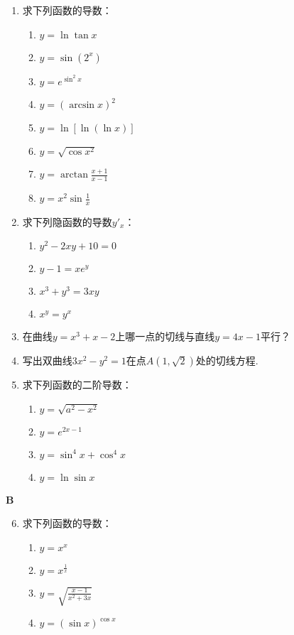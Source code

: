 \begin{enumerate}
    \item 求下列函数的导数： 
\begin{multicols}{2}
\begin{enumerate}[(1)]
    \item $y=\ln\tan x$
    \item $y=\sin(2^x)$
    \item $y=e^{\sin^2 x}$
    \item $y=(\arcsin x)^2$
    \item $y=\ln[\ln(\ln x)]$
    \item $y=\sqrt{\cos x^2}$
    \item $y=\arctan \frac{x+1}{x-1}$
    \item $y=x^2\sin\frac{1}{x}$
\end{enumerate}
\end{multicols}
    \item 求下列隐函数的导数$y'_x$：
\begin{multicols}{2}
\begin{enumerate}[(1)]
    \item $y^2-2xy+10=0$
    \item $y-1=xe^y$
    \item $x^3+y^3=3xy$
    \item $x^y=y^x$
\end{enumerate}
\end{multicols}
    \item 在曲线$y=x^3+x-2$上哪一点的切线与直线$y=4x-1$平行？
    \item  写出双曲线$3x^2-y^2=1$在点$A(1,\sqrt{2})$处的切线方程.
    \item  求下列函数的二阶导数：
\begin{multicols}{2}
\begin{enumerate}[(1)]
    \item $y=\sqrt{a^2-x^2}$
    \item $y=e^{2x-1}$
    \item $y=\sin^4 x+\cos^4 x$
    \item $y=\ln\sin x$
\end{enumerate}
\end{multicols}
\end{enumerate}


\begin{center}
    \bfseries B
\end{center}

\begin{enumerate}\setcounter{enumi}{5}
    \item 求下列函数的导数： 
\begin{multicols}{2}
    \begin{enumerate}
        \item $y=x^x$
        \item $y=x^{\tfrac{1}{x}}$
        \item $y=\sqrt{\frac{x-1}{x^2+3x}}$
        \item $y=(\sin x)^{\cos x}$
    \end{enumerate}
\end{multicols}
\end{enumerate}


